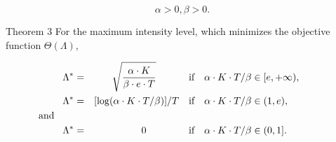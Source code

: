 \begin{equation}\label{eq:abcond}

	\alpha > 0, \beta > 0.

\end{equation}

\smallskip






\hypertarget{b:Th3}{}

\begin{newthm}{Theorem 3} For the maximum intensity level, which minimizes the objective function $\Theta (\Lambda)$,

	\begin{align}

	\label{eq:Th3-1}

{\Lambda}^* & = & \sqrt{\frac{\alpha \cdot K}{\beta \cdot e \cdot T}}~~~~~~~ &

\quad{\text{if$\quad \alpha \cdot K \cdot T / \beta \in [e, +\infty)$}},\\

	\label{eq:Th3-2}

{\Lambda}^* & = & [\log (\alpha \cdot K \cdot T / \beta)] / T &\quad{\text{if$\quad \alpha \cdot K \cdot T / \beta \in (1, e)$}},\\

\text{and\quad\quad} \nonumber \\

	\label{eq:Th3-3}

{\Lambda}^* & = & 0 ~~~~~~~~~~&\quad{\text{if$\quad \alpha \cdot K \cdot T / \beta \in (0, 1]$}}.\qquad\qquad

	\end{align}

\end{newthm}



\smallskip






